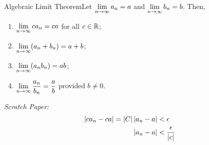 \begin{ntheorem}
    {Algebraic Limit Theorem}Let \(\displaystyle \lim_{n \rightarrow \infty}a_n = a\) and \(\displaystyle \lim_{n \rightarrow \infty}b_n = b\). Then,
    \begin{enumerate}[label=(\roman*)]
        \item \(\displaystyle \lim_{n \rightarrow \infty}ca_n = ca\) for all $c \in \mathbb{R}$;
        \item \(\displaystyle \lim_{n \rightarrow \infty}(a_n + b_n) = a + b\);
        \item \(\displaystyle \lim_{n \rightarrow \infty}(a_nb_n) = ab\);
        \item \(\displaystyle \lim_{n \rightarrow \infty}\frac{a_n}{b_n} = \frac{a}{b}\) provided $b \neq 0$.
    \end{enumerate}
\end{ntheorem}

\textit{Scratch Paper:}
\begin{align*}
    \displaystyle\left|ca_n - ca\right| = \displaystyle\left|C\right|\displaystyle\left|a_n - a\right| & < \epsilon                    \\
    \displaystyle\left|a_n - a\right|                                & < \frac{\epsilon}{\displaystyle\left|c\right|}
\end{align*}
